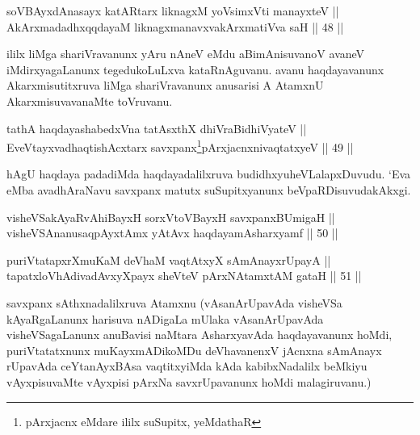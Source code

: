 
\begin{shl}
soV\s BAyxdAnasayx katAR\s tarx liknagxM yoV\s simxVti manayxteV || \\
AkArxmadadhxqqdayaM liknagxmanavxvakArxmatiVva saH \hfill || 48 ||  
\end{shl}

\begin{artha}
ililx liMga shariVravanunx yAru nAneV eMdu aBimAnisuvanoV avaneV
iMdirxyagaLanunx tegedukoLuLxva kataRnAguvanu. avanu haqdayavanunx
Akarxmisutitxruva liMga shariVravanunx anusarisi A AtamxnU
AkarxmisuvavanaMte toVruvanu.
\end{artha}


\begin{shl}
tathA haqdayashabedxVna tatAsxthX dhiVraBidhiVyateV || \\
EveVtayxvadhaqtishAcxtarx savxpanx\footnote{pArxjacnx eMdare ililx suSupitx, yeMdathaR}pArxjacnxnivaqtatxyeV \hfill || 49 ||  
\end{shl}


\begin{artha}
hAgU haqdaya padadiMda haqdayadalilxruva budidhxyu\break heVLalapxDuvudu. `Eva eMba avadhAraNavu savxpanx matutx suSupitxyanunx beVpaRDisuvudakAkxgi.
\end{artha}


\begin{shl}
visheVSakAyaRvAhiBayxH sorxVtoVBayxH savxpanxBUmigaH || \\
visheVSAnanusaqpAyx\s \s tAmx yAtAvx haqdayamAsharxyamf \hfill || 50 || 
\end{shl}

\begin{shl}
puriVtatapxrXmuKaM deVhaM vaqtAtxyX sAmAnayxrUpayA || \\
tapatxloVhAdivadAvxyXpayx sheVteV pArxNAtamxtAM gataH \hfill || 51 ||  
\end{shl}

\begin{artha}
savxpanx sAthxnadalilxruva Atamxnu (vAsanArUpavAda visheVSa
kAyaRgaLanunx harisuva nADigaLa mUlaka vAsanArUpavAda visheVSagaLanunx
anuBavisi naMtara AsharxyavAda haqdayavanunx hoMdi, puriVtatatxnunx
muKayxmADikoMDu deVhavanenxV jAcnxna sAmAnayx rUpavAda ceYtanAyxBAsa
vaqtitxyiMda kAda kabibxNadalilx beMkiyu vAyxpisuvaMte vAyxpisi pArxNa
savxrUpavanunx hoMdi malagiruvanu.)
\end{artha}


